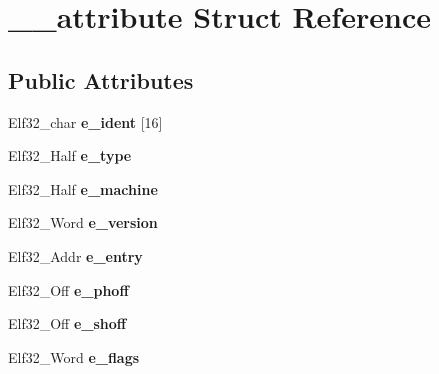 \hypertarget{struct____attribute}{}\section{\+\_\+\+\_\+attribute Struct Reference}
\label{struct____attribute}
\subsection*{Public Attributes}
\begin{DoxyCompactItemize}
\item 
\mbox{\label{struct____attribute_a2a55229369c7a6059926283484840281}} 
Elf32\+\_\+char {\bfseries e\+\_\+ident} \mbox{[}16\mbox{]}
\item 
\mbox{\label{struct____attribute_aa4a21a19856c7e0a833c30f2d0659ac6}} 
Elf32\+\_\+\+Half {\bfseries e\+\_\+type}
\item 
\mbox{\label{struct____attribute_a9ac0d024d51cdb2941204945805bf8bf}} 
Elf32\+\_\+\+Half {\bfseries e\+\_\+machine}
\item 
\mbox{\label{struct____attribute_aca3be6fcb22dbb0c707ca3cdaac129a0}} 
Elf32\+\_\+\+Word {\bfseries e\+\_\+version}
\item 
\mbox{\label{struct____attribute_a25949a9791ac8d32e899a741e8f33c89}} 
Elf32\+\_\+\+Addr {\bfseries e\+\_\+entry}
\item 
\mbox{\label{struct____attribute_a823f5eb0db136730ab7c62c0b000d625}} 
Elf32\+\_\+\+Off {\bfseries e\+\_\+phoff}
\item 
\mbox{\label{struct____attribute_a422f9bc49f7c39b8cb67c4171ac46eab}} 
Elf32\+\_\+\+Off {\bfseries e\+\_\+shoff}
\item 
\mbox{\label{struct____attribute_aed334e7e6aedde50e92ece19bcb3efc4}} 
Elf32\+\_\+\+Word {\bfseries e\+\_\+flags}
\item 
\mbox{\label{struct____attribute_aabd89accdbf27c03f5f41da833548966}} 

\end{DoxyCompactItemize}
